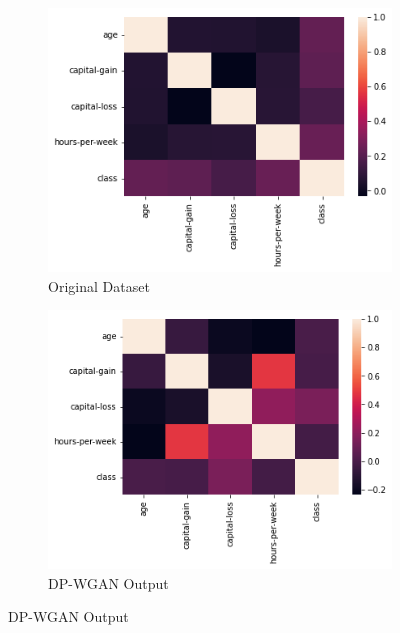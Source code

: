 \documentclass{article}
\begin{document}
\begin{figure}
     \centering
     \begin{subfigure}[b]{0.48\textwidth}
         \centering
         \includegraphics[width=\textwidth]{images/census_heatmap_original.png}
         \caption{Original Dataset}
         \label{fig:corrmatrix_original}
     \end{subfigure}
     \hfill
     \begin{subfigure}[b]{0.48\textwidth}
         \centering
         \includegraphics[width=\textwidth]{images/census_heatmap_dpgan.png}
         \caption{DP-WGAN Output}
         \label{fig:corrmatrix_dpgan}
     \end{subfigure}
     

\end{figure}
\end{document}

